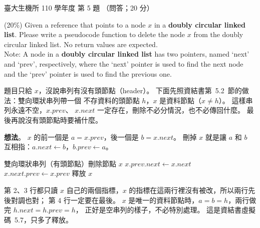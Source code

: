\begin{pastexam}[label={px:ntu-110-bime-ds-05}]{臺大生機所 110 學年度 第 5 題}
（問答；20 分）

(20\%) Given a reference that points to a node $x$ in a \textbf{doubly circular linked list}. Please
write a pseudocode function to delete the node $x$ from the doubly circular linked list. No return
values are expected.\\
Note: A node in a \textbf{doubly circular linked list} has two pointers, named `next' and `prev',
respectively, where the `next' pointer is used to find the next node and the `prev' pointer is used to
find the previous one.
\end{pastexam}

\begin{pastsoln}
題目只給 $x$，沒說串列有沒有頭節點（header）。 下面先照資結書第~5.2~節的做法：雙向環狀串列帶一個
不存資料的頭節點 $h$，$x$ 是資料節點（$x \ne h$）。 這樣串列永遠不空，$x.\mathit{prev}$、
$x.\mathit{next}$ 一定存在，刪除不必分情況，也不必傳回什麼。 最後再說沒有頭節點時要補什麼。

\textbf{想法}。 $x$ 的前一個是 $a = x.\mathit{prev}$，後一個是 $b = x.\mathit{next}$。 刪掉 $x$
就是讓 $a$ 和 $b$ 互相指：$a.\mathit{next} \gets b$，$b.\mathit{prev} \gets a$。
\begin{center}
\end{center}

\begin{pseudo}{雙向環狀串列（有頭節點）刪除節點 $x$}
    \State $x.\mathit{prev}.\mathit{next} \gets x.\mathit{next}$
    \State $x.\mathit{next}.\mathit{prev} \gets x.\mathit{prev}$
    \State 釋放 $x$
\EndProcedure
\end{pseudo}

第 2、3 行都只讀 $x$ 自己的兩個指標，$x$ 的指標在這兩行裡沒有被改，所以兩行先後對調也對；
第 4 行一定要在最後。 $x$ 是唯一的資料節點時，$a = b = h$，兩行做完 $h.\mathit{next} = h.\mathit{prev} = h$，
正好是空串列的樣子，不必特別處理。 這是資結書虛擬碼~5.7，只多了釋放。


\end{pastsoln}
